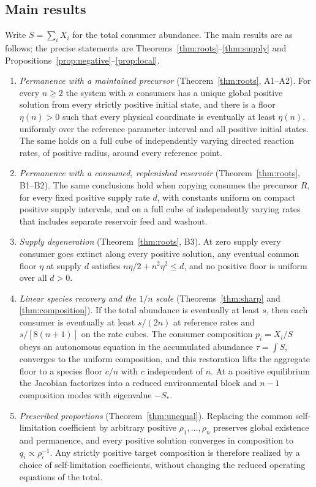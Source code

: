 \documentclass[11pt,a4paper]{article}
\theoremstyle{plain}
\theoremstyle{definition}
\theoremstyle{remark}
\begin{document}
\subsection{Main results}
Write $S=\sum_iX_i$ for the total consumer abundance. The main results are as follows; the precise statements are Theorems~\ref{thm:roots}--\ref{thm:supply} and Propositions~\ref{prop:negative}--\ref{prop:local}.
\begin{enumerate}[label=(\roman*)]
\item \emph{Permanence with a maintained precursor} (Theorem~\ref{thm:roots}, A1--A2). For every $n\ge2$ the system with $n$ consumers has a unique global positive solution from every strictly positive initial state, and there is a floor $\eta(n)>0$ such that every physical coordinate is eventually at least $\eta(n)$, uniformly over the reference parameter interval and all positive initial states. The same holds on a full cube of independently varying directed reaction rates, of positive radius, around every reference point.
\item \emph{Permanence with a consumed, replenished reservoir} (Theorem~\ref{thm:roots}, B1--B2). The same conclusions hold when copying consumes the precursor $R$, for every fixed positive supply rate $d$, with constants uniform on compact positive supply intervals, and on a full cube of independently varying rates that includes separate reservoir feed and washout.
\item \emph{Supply degeneration} (Theorem~\ref{thm:roots}, B3). At zero supply every consumer goes extinct along every positive solution, any eventual common floor $\eta$ at supply $d$ satisfies $n\eta/2+n^2\eta^2\le d$, and no positive floor is uniform over all $d>0$.
\item \emph{Linear species recovery and the $1/n$ scale} (Theorems~\ref{thm:sharp} and \ref{thm:composition}). If the total abundance is eventually at least $s$, then each consumer is eventually at least $s/(2n)$ at reference rates and $s/[8(n+1)]$ on the rate cubes. The consumer composition $p_i=X_i/S$ obeys an autonomous equation in the accumulated abundance $\tau=\int S$, converges to the uniform composition, and this restoration lifts the aggregate floor to a species floor $c/n$ with $c$ independent of $n$. At a positive equilibrium the Jacobian factorizes into a reduced environmental block and $n-1$ composition modes with eigenvalue $-S_*$.
\item \emph{Prescribed proportions} (Theorem~\ref{thm:unequal}). Replacing the common self-limitation coefficient by arbitrary positive $\rho_1,\dots,\rho_n$ preserves global existence and permanence, and every positive solution converges in composition to $q_i\propto\rho_i^{-1}$. Any strictly positive target composition is therefore realized by a choice of self-limitation coefficients, without changing the reduced operating equations of the total.

\end{enumerate}
\end{document}
